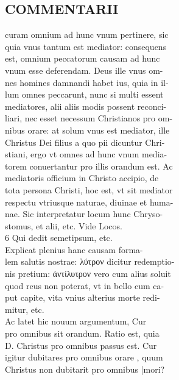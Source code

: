 \documentclass{article}
\begin{document}
\begin{pages}
\section*{COMMENTARII \\
                }curam omnium ad hunc vnum pertinere, sic \\
                quia vnus tantum est mediator: consequens \\
                est, omnium peccatorum causam ad hunc \\
                vnum esse deferendam. Deus ille vnus om- \\
                nes homines damnandi habet ius, quia in il- \\
                lum omnes peccarunt, nunc si multi essent \\
                mediatores, alii aliis modis possent reconci- \\
                liari, nec esset necessum Christianos pro om- \\
                nibus orare: at solum vnus est mediator, ille \\
                Christus Dei filius a quo pii dicuntur Chri- \\
                stiani, ergo vt omnes ad hunc vnum media- \\
                torem conuertantur pro illis orandum est. Ac \\
                mediatoris officium in Christo accipio, de \\
                tota persona Christi, hoc est, vt sit mediator \\
                respectu vtriusque naturae, diuinae et huma- \\
                nae. Sic interpretatur locum hunc Chryso- \\
                stomus, et alii, etc. Vide Locos. \\
                6 Qui dedit semetipsum, etc. \\
                Explicat plenius hanc causam forma- \\
                lem salutis nostrae: λύτρον dicitur redemptio- \\
                nis pretium: ἀντίλυτρον vero cum alius soluit \\
                quod reus non poterat, vt in bello cum ca- \\
                put capite, vita vnius alterius morte redi- \\
                mitur, etc. \\
                Ac latet hic nouum argumentum, Cur \\
                pro omnibus sit orandum. Ratio est, quia \\
                D. Christus pro omnibus passus est. Cur \\
                igitur dubitares pro omnibus orare , quum \\
                Christus non dubitarit pro omnibus |mori? \\
                

\end{pages}
\end{document}

